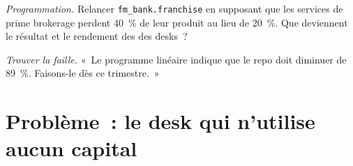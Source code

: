 \begin{exercise}[$\star\star\star$]\label{exo:fm:the-bank-markets-division:7}
\emph{Programmation.} Relancer \texttt{fm\_bank.franchise} en supposant que les services de prime brokerage perdent 40~\% de leur produit au lieu de 20~\%. Que deviennent le résultat et le
rendement des  des desks~?
\end{exercise}

\begin{exercise}[$\star\star\star$]\label{exo:fm:the-bank-markets-division:8}
\emph{Trouver la faille.} «~Le programme linéaire indique que le repo doit diminuer de 89~\%. Faisons-le dès ce trimestre.~»
\end{exercise}

\section{Problème~: le desk qui n'utilise aucun capital}

